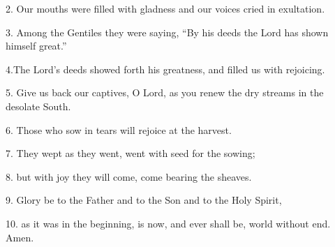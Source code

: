 
2. Our mouths were filled with gladness and our voices cried in exultation.

3. Among the Gentiles they were saying, “By his deeds the Lord has shown himself great.”

4.The Lord’s deeds showed forth his greatness, and filled us with rejoicing.

5. Give us back our captives, O Lord, as you renew the dry streams in the desolate South.

6. Those who sow in tears will rejoice at the harvest.

7. They wept as they went, went with seed for the sowing;

8. but with joy they will come, come bearing the sheaves.

9. Glory be to the Father and to the Son and to the Holy Spirit,

10. as it was in the beginning, is now, and ever shall be, world without end. Amen.